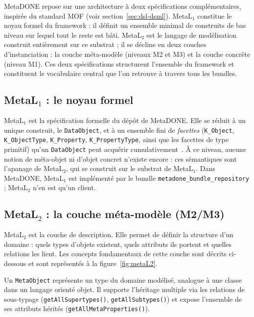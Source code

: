 MetaDONE repose sur une architecture à deux spécifications complémentaires, inspirée du standard MOF (voir section~\ref{sec:dsl-dsml}). MetaL$_1$ constitue le noyau formel du framework : il définit un ensemble minimal de construits de bas niveau sur lequel tout le reste est bâti. MetaL$_2$ est le langage de modélisation construit entièrement sur ce substrat ; il se décline en deux couches d'instanciation : la couche méta-modèle (niveaux M2 et M3) et la couche concrète (niveau M1). Ces deux spécifications structurent l'ensemble du framework et constituent le vocabulaire central que l'on retrouve à travers tous les bundles.

\subsection{MetaL$_1$ : le noyau formel}
\label{sec:metal1}


MetaL$_1$ est la spécification formelle du dépôt de MetaDONE. Elle se réduit à un unique construit, le \texttt{DataObject}, et à un ensemble fini de \emph{facettes} (\texttt{K\_Object}, \texttt{K\_ObjectType}, \texttt{K\_Property}, \texttt{K\_PropertyType}, ainsi que les facettes de type primitif) qu'un \texttt{DataObject} peut acquérir cumulativement~\cite{englebert_metal1}. À ce niveau, aucune notion de \og méta-objet \fg{} ni d'\og objet concret \fg{} n'existe encore : ces sémantiques sont l'apanage de MetaL$_2$, qui se construit sur le substrat de MetaL$_1$. Dans MetaDONE, MetaL$_1$ est implémenté par le bundle \texttt{metadone\_bundle\_repository} ; MetaL$_2$ n'en est qu'un client.


\subsection{MetaL$_2$ : la couche méta-modèle (M2/M3)}
\label{sec:metal2}

MetaL$_2$ est la couche de description. Elle permet de définir la structure d'un domaine : quels types d'objets existent, quels attributs ils portent et quelles relations les lient. Les concepts fondamentaux de cette couche sont décrits ci-dessous et sont représentés à la figure~\ref{fig:metaL2}.

Un \texttt{MetaObject} représente un type du domaine modélisé, analogue à une classe dans un langage orienté objet. Il supporte l'héritage multiple via les relations de sous-typage (\texttt{getAllSupertypes()}, \texttt{getAllSubtypes()}) et expose l'ensemble de ses attributs hérités (\texttt{getAllMetaProperties()}).

